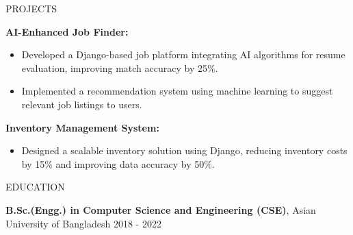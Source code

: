 \documentclass{resume} %
\begin{document}

\begin{rSection}{PROJECTS}

\textbf{AI-Enhanced Job Finder:}
 \begin{itemize}
    \item Developed a Django-based job platform integrating AI algorithms for resume evaluation, improving match accuracy by 25\%.
    \item Implemented a recommendation system using machine learning to suggest relevant job listings to users.
 \end{itemize}

\textbf{Inventory Management System:}
 \begin{itemize}
    \item Designed a scalable inventory solution using Django, reducing inventory costs by 15\% and improving data accuracy by 50\%.
 \end{itemize}

\end{rSection} 


\begin{rSection}{EDUCATION}

{\bf B.Sc.(Engg.) in Computer Science and Engineering (CSE)}, Asian University of Bangladesh \hfill {2018 - 2022}

\end{rSection}



\end{document}
